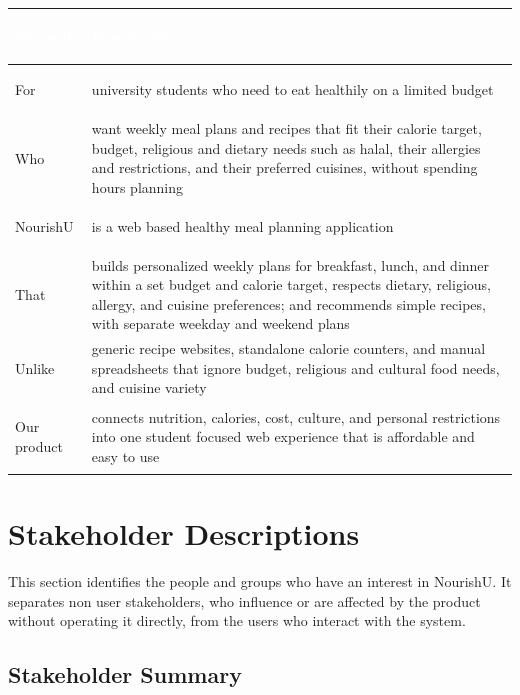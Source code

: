 \documentclass[11pt,a4paper]{article}
\begin{document}
\begin{tabularx}{\textwidth}{>{\bfseries\raggedright\arraybackslash}p{} Y}
\toprule
{}\textcolor{white}{\textbf{Element}} & \textcolor{white}{\textbf{Description}} \\
\midrule
For & university students who need to eat healthily on a limited budget \\
Who & want weekly meal plans and recipes that fit their calorie target, budget, religious and dietary needs such as halal, their allergies and restrictions, and their preferred cuisines, without spending hours planning \\
NourishU & is a web based healthy meal planning application \\
That & builds personalized weekly plans for breakfast, lunch, and dinner within a set budget and calorie target, respects dietary, religious, allergy, and cuisine preferences; and recommends simple recipes, with separate weekday and weekend plans \\
Unlike & generic recipe websites, standalone calorie counters, and manual spreadsheets that ignore budget, religious and cultural food needs, and cuisine variety \\
Our product & connects nutrition, calories, cost, culture, and personal restrictions into one student focused web experience that is affordable and easy to use \\
\bottomrule
\end{tabularx}

\section{Stakeholder Descriptions}

This section identifies the people and groups who have an interest in NourishU. It separates non user stakeholders, who influence or are affected by the product without operating it directly, from the users who interact with the system.

\subsection{Stakeholder Summary}
\end{document}
